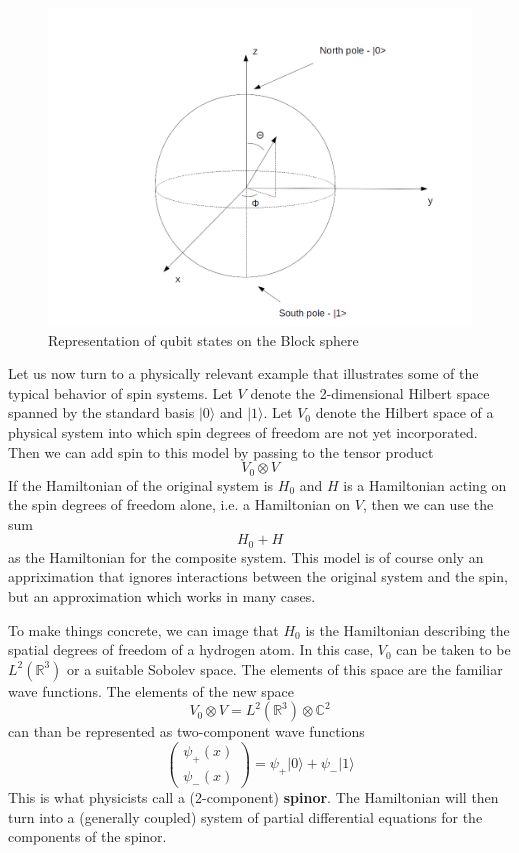 \documentclass[a4paper, draft]{article}
\theoremstyle{own}
\theoremstyle{remark}
\newcommand{\R}{\mathbb{R}}
\newcommand{\C}{\mathbb{C}}
\begin{document}
\begin{figure}[ht]
\centering
\includegraphics[width=0.9\linewidth]{images/BlochSphere}
\caption[Representation of qubit states on the Block sphere]{Representation of qubit states on the Block sphere}
\label{fig:BlochSphere}
\end{figure}

Let us now turn to a physically relevant example that illustrates some of the typical behavior of spin systems. Let $V$ denote the 2-dimensional Hilbert space spanned by the standard basis $|0 \rangle$ and $|1 \rangle$. Let $V_0$ denote the Hilbert space of a physical system into which spin degrees of freedom are not yet incorporated. Then we can add spin to this model by passing to the tensor product
$$
V_0 \otimes V
$$
If the Hamiltonian of the original system is $H_0$ and $H$ is a Hamiltonian acting on the spin degrees of freedom alone, i.e. a Hamiltonian on $V$, then we can use the sum
$$
H_0 + H
$$
as the Hamiltonian for the composite system. This model is of course only an appriximation that ignores interactions between the original system and the spin, but an approximation which works in many cases. 

To make things concrete, we can image that $H_0$ is the Hamiltonian describing the spatial degrees of freedom of a hydrogen atom. In this case, $V_0$ can be taken to be $L^2(\R^3)$ or a suitable Sobolev space. The elements of this space are the familiar wave functions. The elements of the new space 
$$
V_0 \otimes V = L^2(\R^3) \otimes \C^2
$$
can than be represented as two-component wave functions
$$
\begin{pmatrix}
\psi_+(x) \\
\psi_-(x)
\end{pmatrix}
=
\psi_+ |0 \rangle + \psi_- | 1\rangle
$$
This is what physicists call a (2-component) {\bf spinor}. The Hamiltonian will then turn into a (generally coupled) system of partial differential equations for the components of the spinor.
\end{document}
